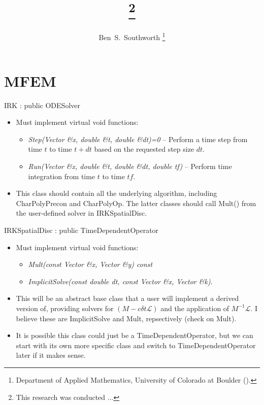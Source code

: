 \documentclass[review]{siamart}
\title{{\TheTitle}\thanks{This research was conducted ...
  }}
\author{%
  Ben~S.~Southworth
  \thanks{Department of Applied Mathematics,
          University of Colorado at Boulder
          (\email{ben.s.southworth@gmail.com}).}
}
\begin{document}
\allowdisplaybreaks

\section{MFEM}\text{ }

\noindent
IRK : public ODESolver
\begin{itemize}
	\item Must implement virtual void functions:
	\begin{itemize}
		\item \textit{Step(Vector \&x, double \&t, double \&dt)=0} -- Perform a time
		step from time $t$ to time $t+dt$ based on the requested step size $dt$.
		\item \textit{Run(Vector \&x, double \&t, double \&dt, double tf)} -- Perform time integration from time $t$ to time $tf$.
	\end{itemize}

	\item This class should contain all the underlying algorithm, including
	CharPolyPrecon and CharPolyOp. The latter classes should call Mult() from
	the user-defined solver in IRKSpatialDisc. 
\end{itemize}

\noindent
IRKSpatialDisc : public TimeDependentOperator
\begin{itemize}
	\item Must implement virtual void functions:
	\begin{itemize}
		\item \textit{Mult(const Vector \&x, Vector \&y) const}
		\item \textit{ImplicitSolve(const double dt, const Vector \&x, Vector \&k)}.
	\end{itemize}

	\item This will be an abstract base class that a user will implement a derived
	version of, providing solvers for $(M - c\delta t \mathcal{L})$ and the application
	of $M^{-1}\mathcal{L}$. I believe these are ImplicitSolve and Mult, repsectively
	(check on Mult).

	\item It is possible this class could just be a TimeDependentOperator, but we
	can start with its own more specific class and switch to TimeDependentOperator
	later if it makes sense.

\end{itemize}
\end{document}
